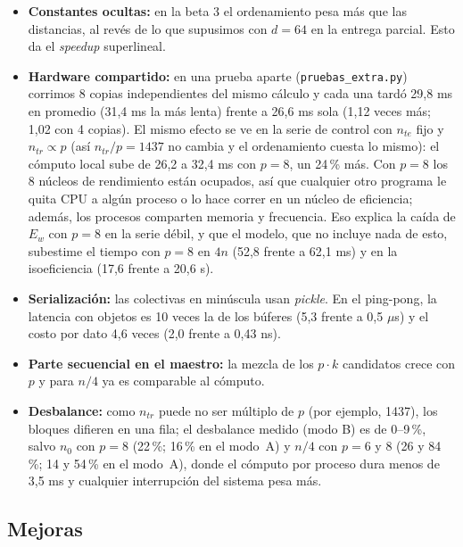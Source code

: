 \documentclass[11pt,a4paper]{article}
\newcommand{\ntr}{n_{tr}}
\newcommand{\nte}{n_{te}}
\begin{document}
\begin{itemize}[nosep]
  \item \textbf{Constantes ocultas:} en la beta 3 el ordenamiento pesa más que las distancias, al revés de lo que supusimos con $d = 64$ en la entrega parcial. Esto da el \textit{speedup} superlineal.
  \item \textbf{Hardware compartido:} en una prueba aparte (\texttt{pruebas\_extra.py}) corrimos 8 copias independientes del mismo cálculo y cada una tardó 29,8 ms en promedio (31,4 ms la más lenta) frente a 26,6 ms sola (1,12 veces más; 1,02 con 4 copias). El mismo efecto se ve en la serie de control con $\nte$ fijo y $\ntr \propto p$ (así $\ntr/p = 1437$ no cambia y el ordenamiento cuesta lo mismo): el cómputo local sube de 26,2 a 32,4 ms con $p = 8$, un 24\,\% más. Con $p = 8$ los 8 núcleos de rendimiento están ocupados, así que cualquier otro programa le quita CPU a algún proceso o lo hace correr en un núcleo de eficiencia; además, los procesos comparten memoria y frecuencia. Eso explica la caída de $E_w$ con $p = 8$ en la serie débil, y que el modelo, que no incluye nada de esto, subestime el tiempo con $p = 8$ en $4n$ (52,8 frente a 62,1 ms) y en la isoeficiencia (17,6 frente a 20,6 s).
  \item \textbf{Serialización:} las colectivas en minúscula usan \textit{pickle}. En el ping-pong, la latencia con objetos es 10 veces la de los búferes (5,3 frente a 0,5 $\mu$s) y el costo por dato 4,6 veces (2,0 frente a 0,43 ns).
  \item \textbf{Parte secuencial en el maestro:} la mezcla de los $p\cdot k$ candidatos crece con $p$ y para $n/4$ ya es comparable al cómputo.
  \item \textbf{Desbalance:} como $\ntr$ puede no ser múltiplo de $p$ (por ejemplo, 1437), los bloques difieren en una fila; el desbalance medido (modo B) es de 0--9\,\%, salvo $n_0$ con $p = 8$ (22\,\%; 16\,\% en el modo~A) y $n/4$ con $p = 6$ y $8$ (26 y 84\,\%; 14 y 54\,\% en el modo~A), donde el cómputo por proceso dura menos de 3,5 ms y cualquier interrupción del sistema pesa más.
\end{itemize}

\subsection{Mejoras}
\label{sec:mejoras}
\end{document}
